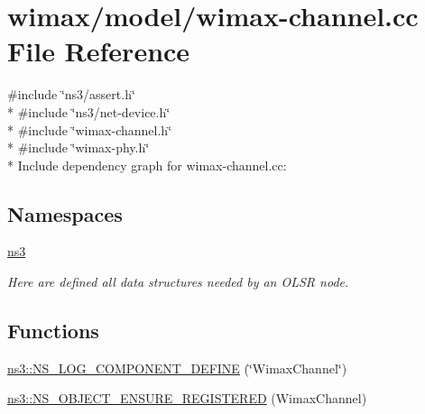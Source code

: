 \hypertarget{wimax-channel_8cc}{}\section{wimax/model/wimax-\/channel.cc File Reference}
\label{wimax-channel_8cc}
{\ttfamily \#include \char`\"{}ns3/assert.\+h\char`\"{}}\\*
{\ttfamily \#include \char`\"{}ns3/net-\/device.\+h\char`\"{}}\\*
{\ttfamily \#include \char`\"{}wimax-\/channel.\+h\char`\"{}}\\*
{\ttfamily \#include \char`\"{}wimax-\/phy.\+h\char`\"{}}\\*
Include dependency graph for wimax-\/channel.cc\+:
\subsection*{Namespaces}
\begin{DoxyCompactItemize}
\item 
 \hyperlink{namespacens3}{ns3}
\begin{DoxyCompactList}\small\item\em Here are defined all data structures needed by an O\+L\+SR node. \end{DoxyCompactList}\end{DoxyCompactItemize}
\subsection*{Functions}
\begin{DoxyCompactItemize}
\item 
\hyperlink{namespacens3_a2fcbdd47c17f81beb27171882b7159a6}{ns3\+::\+N\+S\+\_\+\+L\+O\+G\+\_\+\+C\+O\+M\+P\+O\+N\+E\+N\+T\+\_\+\+D\+E\+F\+I\+NE} (\char`\"{}Wimax\+Channel\char`\"{})
\item 
\hyperlink{namespacens3_ac232d470c69ba3fa75ef00a3b34a7974}{ns3\+::\+N\+S\+\_\+\+O\+B\+J\+E\+C\+T\+\_\+\+E\+N\+S\+U\+R\+E\+\_\+\+R\+E\+G\+I\+S\+T\+E\+R\+ED} (Wimax\+Channel)
\end{DoxyCompactItemize}
